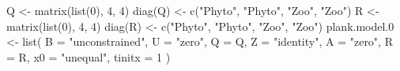 \begin{Schunk}
\begin{Sinput}
 Q <- matrix(list(0), 4, 4)
 diag(Q) <- c("Phyto", "Phyto", "Zoo", "Zoo")
 R <- matrix(list(0), 4, 4)
 diag(R) <- c("Phyto", "Phyto", "Zoo", "Zoo")
 plank.model.0 <- list(
   B = "unconstrained", U = "zero", Q = Q,
   Z = "identity", A = "zero", R = R,
   x0 = "unequal", tinitx = 1
 )
\end{Sinput}
\end{Schunk}
